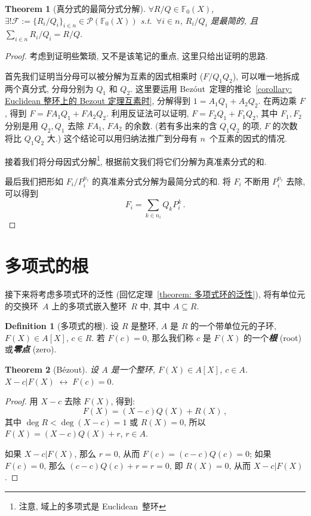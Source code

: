 \documentclass[openany]{ctexbook}
\newcommand*{\indexbf}[1]{\emph{\textbf{#1}}\index{#1}} %
\theoremstyle{plain}
\newtheorem{theorem}{Theorem}[section] %
\theoremstyle{definition}
\newtheorem{definition}{Definition}[section] %
\newcommand*{\IFF}{\;\leftrightarrow\;} %
\begin{document}
\begin{theorem}[真分式的最简分式分解]
	$\forall R/Q \in \mathbb F_0(X)$, $\exists! \mathscr F:=\{R_i/Q_i\}_{i \in n} \in \mathscr P(\mathbb F_0(X))$ s.t.\ $\forall i \in n$, $R_i/Q_i$ 是最简的, 且 $\sum_{i \in n} R_i/Q_i = R/Q$.
\end{theorem}
\begin{proof}
	考虑到证明些繁琐, 又不是该笔记的重点, 这里只给出证明的思路. 
	
	首先我们证明当分母可以被分解为互素的因式相乘时 ($F / Q_1 Q_2$), 可以唯一地拆成两个真分式, 分母分别为 $Q_1$ 和 $Q_2$. 
	这里要运用 Bez\'out~定理的推论~\ref{corollary: Euclidean 整环上的 Bezout 定理互素时}, 
	分解得到 $1 = A_1 Q_1 + A_2 Q_2$. 
	在两边乘 $F$, 得到 $F = F A_1 Q_1 + F A_2 Q_2$. 
	利用反证法可以证明, $F = F_2 Q_1 + F_1 Q_2$, 其中 $F_1, F_2$ 分别是用 $Q_2, Q_1$ 去除 $F A_1$, $F A_2$ 的余数. (若有多出来的含 $Q_1Q_2$ 的项, $F$ 的次数将比 $Q_1 Q_2$ 大.) 这个结论可以用归纳法推广到分母有 $n$~个互素的因式的情况.
	
	接着我们将分母因式分解\footnote{注意, 域上的多项式是 Euclidean~整环}, 根据前文我们将它们分解为真准素分式的和.

	最后我们把形如 $F_i/P_i^{n_i}$ 的真准素分式分解为最简分式的和. 将 $F_i$ 不断用 $P_i^{n_i}$ 去除, 可以得到
	\begin{equation*}
		F_i = \sum_{k \in n_i} Q_k P_i^k\,.
	\end{equation*}
\end{proof}

\section{多项式的根}

接下来将考虑多项式环的泛性 (回忆定理~\ref{theorem: 多项式环的泛性}), 将有单位元的交换环~$A$ 上的多项式嵌入整环~$R$ 中, 其中 $A \subseteq R$. 

\begin{definition}[多项式的根]
	设 $R$ 是整环, $A$ 是 $R$ 的一个带单位元的子环, $F(X) \in A[X]$, $c \in R$.
	若 $F(c) = 0$, 那么我们称 $c$ 是 $F(X)$ 的一个\indexbf{根} (root) 或\indexbf{零点} (zero).
\end{definition}

\begin{theorem}[B\'ezout]\label{theorem: Bezout}
	设 $A$ 是一个整环, $F(X) \in A[X]$, $c \in A$.
	$X - c \vert F(X) \IFF F(c) = 0$. 
\end{theorem}
\begin{proof}
	用 $X - c$ 去除 $F(X)$, 得到:
	\begin{equation*}
		F(X) = (X - c) Q(X) + R(X)\,,
	\end{equation*}
	其中 $\deg R < \deg(X - c) = 1$ 或 $R(X) = 0$, 所以 $F(X) = (X - c) Q(X) + r$, $r \in A$.

	如果 $X - c \vert F(X)$, 那么 $r = 0$, 从而 $F(c) = (c - c) Q(c) = 0$; 如果 $F(c) = 0$, 那么 $(c - c)Q(c) + r = r = 0$, 即 $R(X) = 0$, 从而 $X - c \vert F(X)$.
\end{proof}
\end{document}

